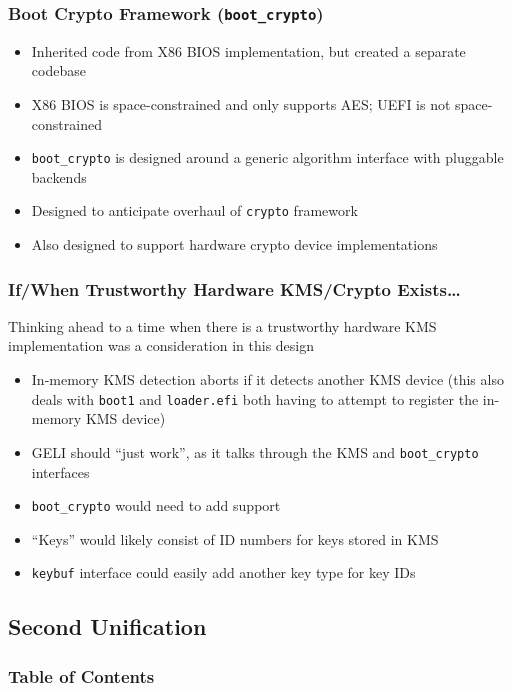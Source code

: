 \documentclass{beamer}
\begin{document}
\begin{frame}
  \frametitle{Boot Crypto Framework (\texttt{boot\_crypto})}
  \begin{itemize}
  \item Inherited code from X86 BIOS implementation, but created a
    separate codebase
  \item X86 BIOS is space-constrained and only supports AES; UEFI is
    not space-constrained
  \item \texttt{boot\_crypto} is designed around a generic algorithm
    interface with pluggable backends
  \item Designed to anticipate overhaul of \texttt{crypto} framework
  \item Also designed to support hardware crypto device implementations
  \end{itemize}
\end{frame}

\begin{frame}
  \frametitle{If/When Trustworthy Hardware KMS/Crypto Exists\ldots}
  Thinking ahead to a time when there is a trustworthy hardware KMS
  implementation was a consideration in this design
  \begin{itemize}
  \item In-memory KMS detection aborts if it detects another KMS
    device (this also deals with \texttt{boot1} and
    \texttt{loader.efi} both having to attempt to register the
    in-memory KMS device)
  \item GELI should ``just work'', as it talks through the KMS and
    \texttt{boot\_crypto} interfaces
  \item \texttt{boot\_crypto} would need to add support
  \item ``Keys'' would likely consist of ID numbers for keys stored in
    KMS
  \item \texttt{keybuf} interface could easily add another key type for key IDs
  \end{itemize}
\end{frame}

\subsection{Second Unification}

\begin{frame}
  \frametitle{Table of Contents}
  \tableofcontents[currentsection]
\end{frame}
\end{document}
